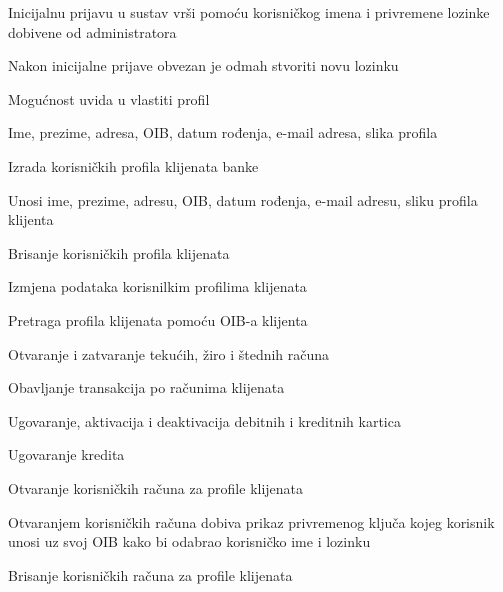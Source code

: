 \begin{packed_enum}
				\begin{packed_enum}
					
					\item Inicijalnu prijavu u sustav vrši pomoću korisničkog imena i privremene lozinke dobivene od administratora
					\begin{packed_enum}
						\item Nakon inicijalne prijave obvezan je odmah stvoriti novu lozinku
					\end{packed_enum}
					\item Mogućnost uvida u vlastiti profil
					\begin{packed_enum}
						\item Ime, prezime, adresa, OIB, datum rođenja, e-mail adresa, slika profila
					\end{packed_enum}
					\item Izrada korisničkih profila klijenata banke
					\begin{packed_enum}
						\item Unosi ime, prezime, adresu, OIB, datum rođenja, e-mail adresu, sliku profila klijenta
					\end{packed_enum}
					\item Brisanje korisničkih profila klijenata
					\item Izmjena podataka korisnilkim profilima klijenata
					\item Pretraga profila klijenata pomoću OIB-a klijenta
					\item Otvaranje i zatvaranje tekućih, žiro i štednih računa
					\item Obavljanje transakcija po računima klijenata
					\item Ugovaranje, aktivacija i deaktivacija debitnih i kreditnih kartica
					\item Ugovaranje kredita
					\item Otvaranje korisničkih računa za profile klijenata
					\begin{packed_enum}
						\item Otvaranjem korisničkih računa dobiva prikaz privremenog ključa kojeg korisnik unosi uz svoj OIB kako bi odabrao korisničko ime i lozinku
					\end{packed_enum}
					\item Brisanje korisničkih računa za profile klijenata
					
				\end{packed_enum}
			
				\item	{}
				

\end{packed_enum}
